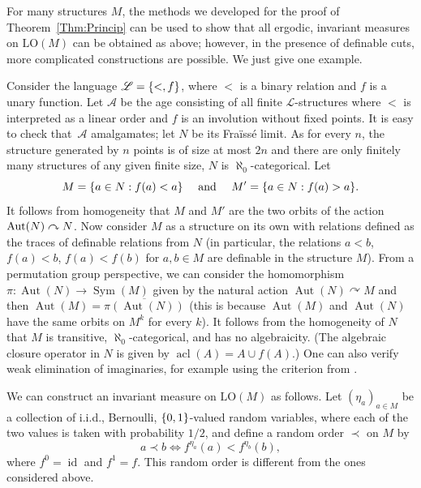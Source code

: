 \documentclass[JEP,XML,SOM,Unicode,published]{cedram}
\let\mathcal\mathscr
\let\actson\curvearrowright
\theoremstyle{plain}
\theoremstyle{definition}
\newcommand{\cA}{\mathcal{A}}
\newcommand{\cL}{\mathcal{L}}
\DeclareMathOperator{\acl}{acl}
\DeclareMathOperator{\Aut}{Aut}
\DeclareMathOperator{\id}{id}
\DeclareMathOperator{\Sym}{Sym}
\DeclarePairedDelimiter\set{\{}{\}}
\newcommand{\LO}{\mathrm{LO}}
\renewcommand{\And}{\text{ and }}
\newcommand{\cl}[2][]{\overline{#2}^{#1}}
\begin{document}
For many structures $M$, the methods we developed for the proof of Theorem~\ref{Thm:Princip} can be used to show that all ergodic, invariant measures on $\LO(M)$ can be obtained as above; however, in the presence of definable cuts, more complicated constructions are possible. We just give one example.

Consider the language $\cL = \set{<, f}$, where $<$ is a binary relation and $f$ is a unary function. Let $\cA$ be the age consisting of all finite $\cL$-structures where $<$ is interpreted as a linear order and $f$ is an involution without fixed points. It is easy to check that~$\cA$ amalgamates; let $N$ be its Fraïssé limit. As for every $n$, the structure generated by $n$ points is of size at most $2n$ and there are only finitely many structures of any given finite size, $N$ is $\aleph_0$-categorical. Let
\[
M = \set{a \in N : f(a) < a}\quad\And\quad M' = \set{a \in N : f(a) > a}.
\]
It follows from homogeneity that $M$ and $M'$ are the two orbits of the action $\Aut(N) \actson\nobreak N$. Now consider $M$ as a structure on its own with relations defined as the traces of definable relations from $N$ (in particular, the relations $a < b$, $f(a) < b$, $f(a) < f(b)$ for $a, b \in M$ are definable in the structure $M$). From a permutation group perspective, we can consider the homomorphism $\pi \colon \Aut(N) \to \Sym(M)$ given by the natural action $\Aut(N) \actson M$ and then $\Aut(M) = \cl{\pi(\Aut(N))}$ (this is because $\Aut(M)$ and $\Aut(N)$ have the same orbits on $M^k$ for every $k$). It follows from the homogeneity of $N$ that $M$ is transitive, $\aleph_0$-categorical, and has no algebraicity. (The algebraic closure operator in $N$ is given by $\acl(A) = A \cup f(A)$.) One can also verify weak elimination of imaginaries, for example using the criterion from \cite[Prop.\,10.1]{Rideau2019}.

We can construct an invariant measure on $\LO(M)$ as follows. Let $(\eta_a)_{a \in M}$ be a collection of i.i.d., Bernoulli, $\set{0, 1}$-valued random variables, where each of the two values is taken with probability $1/2$, and define a random order $\prec$ on $M$ by
\begin{equation*}
a \prec b \iff f^{\eta_a}(a) < f^{\eta_b}(b),
\end{equation*}
where $f^0 = \id$ and $f^1 = f$. This random order is different from the ones considered above.

\backmatter


\end{document}
